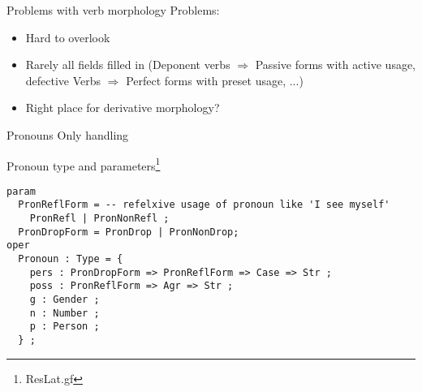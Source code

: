 \documentclass{beamer}
\begin{document}
\begin{frame}{Problems with verb morphology}
Problems:
\begin{itemize}
  \item Hard to overlook
  \item Rarely all fields filled in (Deponent verbs $\Rightarrow$ Passive forms with active usage, defective Verbs $\Rightarrow$ Perfect forms with preset usage, ...)
  \item Right place for derivative morphology?
\end{itemize}
\end{frame}
\begin{frame}[fragile]{Pronouns}
Only handling 
\begin{example}{Pronoun type and parameters\footnote{ResLat.gf}}
\begin{Verbatim}
param
  PronReflForm = -- refelxive usage of pronoun like 'I see myself'
    PronRefl | PronNonRefl ; 
  PronDropForm = PronDrop | PronNonDrop;
oper  
  Pronoun : Type = {
    pers : PronDropForm => PronReflForm => Case => Str ;
    poss : PronReflForm => Agr => Str ;
    g : Gender ;
    n : Number ;
    p : Person ;
  } ;
\end{Verbatim}
\end{example}
\end{frame}
\end{document}
